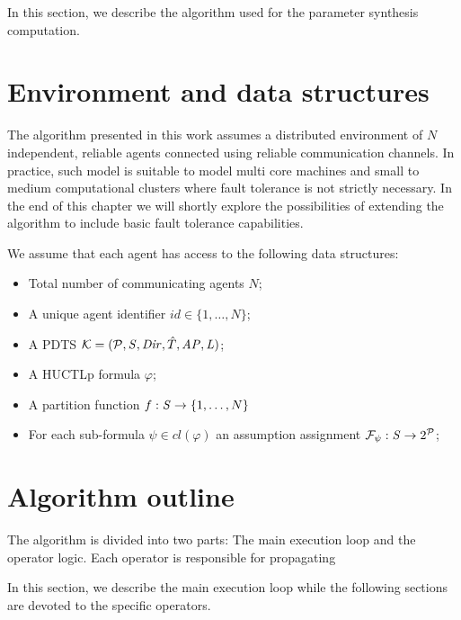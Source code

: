 In this section, we describe the algorithm used for the parameter synthesis computation.

\section{Environment and data structures}

The algorithm presented in this work assumes a distributed environment of $N$ independent, reliable agents connected using reliable communication channels. In practice, such model is suitable to model multi core machines and small to medium computational clusters where fault tolerance is not strictly necessary. In the end of this chapter we will shortly explore the possibilities of extending the algorithm to include basic fault tolerance capabilities. 

We assume that each agent has access to the following data structures:

\begin{itemize}
	\item Total number of communicating agents $N$;
	\item A unique agent identifier $id \in \{ 1, \ldots, N \}$;
	\item A \ac{PDTS} $\mathcal{K} = (\mathcal{P}, \mathit{S}, \mathit{Dir}, \hat{T}, \mathit{AP}, \mathit{L})$;
	\item A \ac{HUCTLp} formula $\varphi$;
	\item A partition function $f : \mathit{S} \to \{1, \ldots, N \}$
	\item For each sub-formula $\psi \in cl(\varphi)$ an assumption assignment $\mathcal{F}_\psi : \mathit{S} \to 2^{\mathcal{P}}$;
\end{itemize}

\section{Algorithm outline}

The algorithm is divided into two parts: The main execution loop and the operator logic. Each operator is responsible for propagating 

In this section, we describe the main execution loop while the following sections are devoted to the specific operators.

